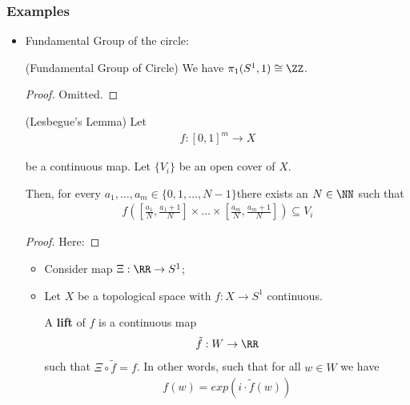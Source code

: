 \documentclass[Total.tex]{subfiles}
\begin{document}
	\subsubsection{Examples}
	\begin{itemize}
		\item Fundamental Group of the circle:
		\begin{theorem}
			(Fundamental Group of Circle) We have $\pi_1(S^1,1)\cong \ZZ$.
		\end{theorem}
		\begin{proof}
			Omitted.
		\end{proof}
		\begin{lemma}
			(Lesbegue's Lemma) Let
			\begin{gather*}
				f:[0,1]^m\rightarrow X
			\end{gather*}
			
			be a continuous map. Let $\{V_i\}$ be an open cover of $X$. 
			
			Then, for every $a_1,\dots,a_m\in \{0,1,\dots,N-1\}$there exists an $N\in \NN$ such that
			\begin{gather*}
				f([\frac{a_1}{N},\frac{a_1+1}{N}]\times\dots\times [\frac{a_m}{N},\frac{a_m+1}{N}])\subseteq V_i
			\end{gather*}
		\end{lemma}
		\begin{proof}
			Here: 
		\end{proof}
		\begin{Def}
			\begin{itemize}
				\item Consider map $\Xi:\RR\rightarrow S^1$;
				\item Let $X$ be a topological space with $f:X\rightarrow S^1$ continuous.
				
				A \textbf{lift} of $f$ is a continuous map
				\begin{gather*}
					\tilde{f}:W\rightarrow \RR
				\end{gather*}
				such that $\Xi\circ \tilde{f}=f$. In other words, such that for all $w\in W$ we have
				\begin{gather*}
					f(w)=exp(i\cdot \tilde{f}(w))
				\end{gather*}
				\begin{center}
				\end{center}
			\end{itemize}
		\end{Def}
		

\end{itemize}
\end{document}
